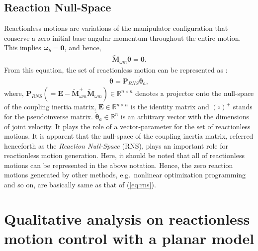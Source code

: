 \documentclass[preprint,12pt]{elsarticle}
\def\eq#1{{(\ref{eq:#1})}}
\def\R#1{{\in\mathbb{R}^{#1}}}
\def\thd{{\dot{\bbm{\theta}}}}
\def\tbm#1{{\tilde{\bbm{#1}}}}
\def\bbm#1{\bm{#1}}
\begin{document}
\subsection{Reaction Null-Space}
\label{sec:RNS}
Reactionless motions are variations of the manipulator configuration that conserve a zero
initial base angular momentum throughout the entire motion.
This implies $\bm{\omega}_{b} = \bm{0}$, and hence,
%
\begin{align}
  \tbm{M}_{\omega m}\thd = \bm{0}.
\end{align}
%
From this equation,
the set of reactionless motion can be represented as \cite{Nenchev19992}:
%
\begin{align}
  \thd = \bm{P}_{RNS}\thd_{a},\label{eq:rns}
\end{align}
%
where,
$\bm{P}_{RNS} (= \bm{E} - \tbm{M}_{\omega m}^{+}\tbm{M}_{\omega m})\R{n \times n}$ denotes
a projector onto the null-space of the coupling inertia matrix,
$\bm{E}\R{n \times n}$ is the identity matrix and 
$(\circ)^{+}$ stands for the pseudoinverse matrix.
$\thd_{a}\R{n}$ is an arbitrary vector with the dimensions of joint velocity.
It plays the role of a vector-parameter for the  set of reactionless motions.
It is apparent that the null-space of the coupling inertia matrix,
referred henceforth as the \textit{Reaction Null-Space }(RNS),
plays an important role for reactionless motion generation.
Here, it should be noted that all of reactionless motions can be represented 
in the above notation.
Hence,
the zero reaction motions generated by other methods, e.g.\ nonlinear optimization programming and so on,
are basically same as that of \eq{rns}.


\section{Qualitative analysis on reactionless motion control with a planar model}
\end{document}
